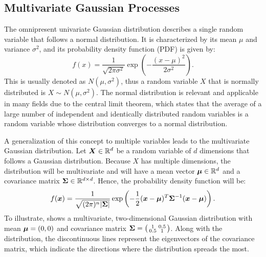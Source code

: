 \subsection{Multivariate Gaussian Processes}

The omnipresent univariate Gaussian distribution describes a single random variable that follows a normal distribution. It is characterized by its mean $\mu$ and variance $\sigma^2$, and its probability density function (PDF) is given by:
\begin{equation*}
    f(x) = \frac{1}{\sqrt{2\pi\sigma^2}} \exp\left(-\frac{(x - \mu)^2}{2\sigma^2}\right).
\end{equation*}
This is usually denoted as $N(\mu, \sigma^2)$, thus a random variable $X$ that is normally distributed is $X\sim N(\mu, \sigma^2)$. The normal distribution is relevant and applicable in many fields due to the central limit theorem, which states that the average of a large number of independent and identically distributed random variables is a random variable whose distribution converges to a normal distribution.

A generalization of this concept to multiple variables leads to the multivariate Gaussian distribution. Let $\boldsymbol{X} \in \mathbb{R}^d$ be a random variable of $d$ dimensions that follows a Gaussian distribution. Because $X$ has multiple dimensions, the distribution will be multivariate and will have a mean vector $\boldsymbol{\mu}\in\mathbb{R}^d$ and a covariance matrix $\boldsymbol{\Sigma}\in\mathbb{R}^{d\times d}$. Hence, the probability density function will be:
\begin{equation}
    f(\boldsymbol{x}) = \frac{1}{\sqrt{(2\pi)^n |\boldsymbol{\Sigma}|}} \exp\left(-\frac{1}{2}(\boldsymbol{x} - \boldsymbol{\mu})^T \boldsymbol{\Sigma}^{-1} (\boldsymbol{x} - \boldsymbol{\mu})\right).
    \label{eq:gaussian_dist}
\end{equation}
To illustrate,  shows a multivariate, two-dimensional Gaussian distribution with mean $\boldsymbol{\mu} = (0,0)$ and covariance matrix $\boldsymbol{\Sigma} = \bigl( \begin{smallmatrix}1 & 0.5\\ 0.5 & 1\end{smallmatrix}\bigr)$. Along with the distribution, the discontinuous lines represent the eigenvectors of the covariance matrix, which indicate the directions where the distribution spreads the most.

